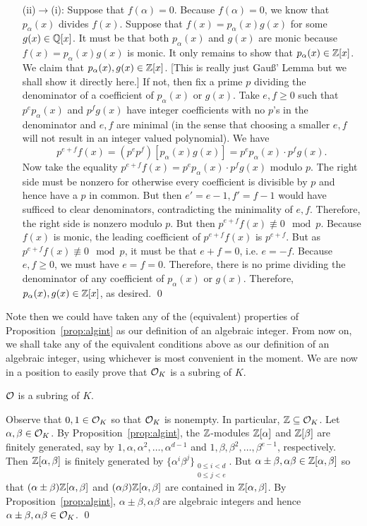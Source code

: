 \begin{enumerate}
\item[(ii)$\to$(i):] Suppose that $f(\alpha)=0$. Because $f(\alpha)= 0$, we know that $p_\alpha(x)$ divides $f(x)$. Suppose that $f(x)= p_\alpha(x)g(x)$ for some $g(x) \in \mathbb{Q}[x]$. It must be that both $p_\alpha(x)$ and $g(x)$ are monic because $f(x)= p_\alpha(x) g(x)$ is monic. It only remains to show that $p_\alpha(x) \in \mathbb{Z}[x]$. We claim that $p_\alpha(x),g(x) \in \mathbb{Z}[x]$. [This is really just Gau\ss' Lemma but we shall show it directly here.] If not, then fix a prime $p$ dividing the denominator of a coefficient of $p_\alpha(x)$ or $g(x)$. Take $e,f \geq 0$ such that $p^ep_\alpha(x)$ and $p^fg(x)$ have integer coefficients with no $p$'s in the denominator and $e,f$ are minimal (in the sense that choosing a smaller $e,f$ will not result in an integer valued polynomial). We have
	\[
	p^{e+f} f(x) = (p^e p^f) [p_\alpha(x) g(x) ]= p^e p_\alpha(x) \cdot p^f g(x).
	\]
Now take the equality $p^{e+f} f(x)= p^e p_\alpha(x) \cdot p^f g(x)$ modulo $p$. The right side must be nonzero for otherwise every coefficient is divisible by $p$ and hence have a $p$ in common. But then $e'= e-1, f'= f-1$ would have sufficed to clear denominators, contradicting the minimality of $e, f$. Therefore, the right side is nonzero modulo $p$. But then $p^{e+f} f(x) \not\equiv 0 \mod p$. Because $f(x)$ is monic, the leading coefficient of $p^{e+f} f(x)$ is $p^{e+f}$. But as $p^{e+f} f(x) \not\equiv 0 \mod p$, it must be that $e+f= 0$, i.e. $e= -f$. Because $e,f \geq 0$, we must have $e= f= 0$. Therefore, there is no prime dividing the denominator of any coefficient of $p_\alpha(x)$ or $g(x)$. Therefore, $p_\alpha(x),g(x) \in \mathbb{Z}[x]$, as desired. \qed 
\end{enumerate}


Note then we could have taken any of the (equivalent) properties of Proposition~\ref{prop:algint} as our definition of an algebraic integer. From now on, we shall take any of the equivalent conditions above as our definition of an algebraic integer, using whichever is most convenient in the moment. We are now in a position to easily prove that $\mathcal{O}_K$ is a subring of $K$. 


\begin{prop}\label{prop:subring}
$\mathcal{O}$ is a subring of $K$.
\end{prop}

\pf Observe that $0,1 \in \mathcal{O}_K$ so that $\mathcal{O}_K$ is nonempty. In particular, $\mathbb{Z} \subseteq \mathcal{O}_K$. Let $\alpha, \beta \in \mathcal{O}_K$. By Proposition~\ref{prop:algint}, the $\mathbb{Z}$-modules $\mathbb{Z}[\alpha]$ and $\mathbb{Z}[\beta]$ are finitely generated, say by $1, \alpha, \alpha^2, \ldots, \alpha^{d-1}$ and $1, \beta, \beta^2, \ldots, \beta^{e-1}$, respectively. Then $\mathbb{Z}[\alpha, \beta]$ is finitely generated by $\{\alpha^i \beta^j\}_{\substack{0 \leq i < d \\ 0 \leq j < e}}$. But $\alpha \pm \beta, \alpha\beta \in \mathbb{Z}[\alpha, \beta]$ so that $(\alpha \pm \beta) \mathbb{Z}[\alpha, \beta]$ and $(\alpha \beta) \mathbb{Z}[\alpha, \beta]$ are contained in $\mathbb{Z}[\alpha, \beta]$. By Proposition~\ref{prop:algint}, $\alpha \pm \beta, \alpha \beta$ are algebraic integers and hence $\alpha \pm \beta, \alpha \beta \in \mathcal{O}_K$. \qed \pskip


